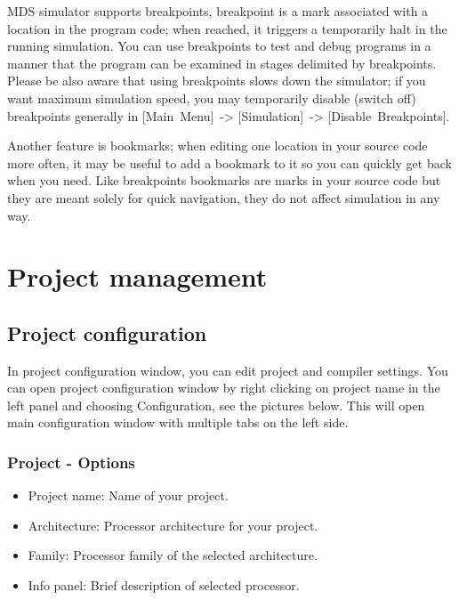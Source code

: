         MDS simulator supports breakpoints, breakpoint is a mark associated with a location in the program code; when reached, it triggers a temporarily halt in the running simulation. You can use breakpoints to test and debug programs in a manner that the program can be examined in stages delimited by breakpoints. Please be also aware that using breakpoints slows down the simulator; if you want maximum simulation speed, you may temporarily disable (switch off) breakpoints generally in [Main~Menu]~-> [Simulation]~-> [Disable~Breakpoints].

        Another feature is bookmarks; when editing one location in your source code more often, it may be useful to add a bookmark to it so you can quickly get back when you need. Like breakpoints bookmarks are marks in your source code but they are meant solely for quick navigation, they do not affect simulation in any way.

\section{Project management}
    \subsection{Project configuration}
        In project configuration window, you can edit project and compiler settings. You can open project configuration
        window by right clicking on project name in the left panel and choosing Configuration, see the pictures below.
        This will open main configuration window with multiple tabs on the left side.

        \subsubsection{Project - Options}
            \begin{itemize}
                \item Project name: Name of your project.
                \item Architecture: Processor architecture for your project.
                \item Family: Processor family of the selected architecture.
                \item Info panel: Brief description of selected processor.
            \end{itemize}

